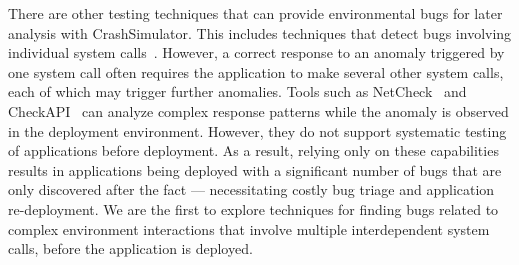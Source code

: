 

There
are other testing techniques that can provide environmental bugs for later
analysis with CrashSimulator.  This includes
techniques that detect bugs involving individual system
calls~\cite{Koopman00theexception,Dadeau:2008:CSM:1433121.1433137,Farchi02}.
However, a correct response to an anomaly triggered by one system call
often requires the application to make several other system calls,
each of which may trigger further anomalies. Tools such as
NetCheck~\cite{Zhuang_NSDI_2014} and
CheckAPI~\cite{rasley2015detecting} can analyze complex response
patterns while the anomaly is observed in the deployment
environment. However, they do not support systematic testing of
applications before deployment.  As a result, relying only on these
capabilities results in applications being deployed with a significant
number of bugs that are only discovered after the fact ---
necessitating costly bug triage and application re-deployment.
We are the first to
explore techniques for finding bugs related to complex
environment interactions that involve multiple interdependent system
calls, before the application is deployed. 


